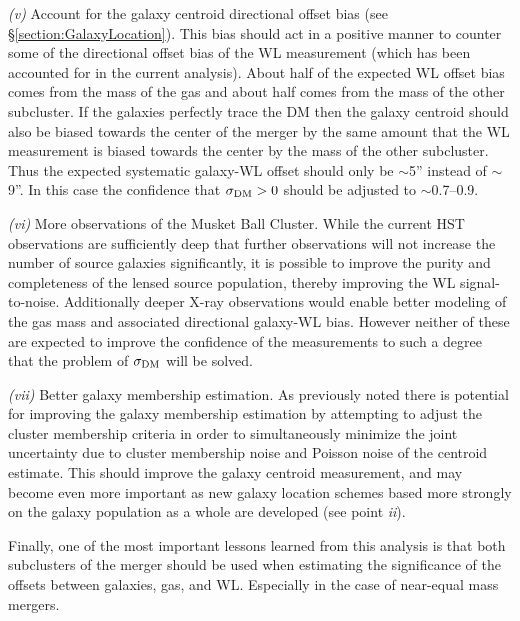 \textit{(v)} Account for the galaxy centroid directional offset bias (see \S\ref{section:GalaxyLocation}).
This bias should act in a positive manner to counter some of the directional offset bias of the WL measurement (which has been accounted for in the current analysis).
About half of the expected WL offset bias comes from the mass of the gas and about half comes from the mass of the other subcluster.
If the galaxies perfectly trace the DM then the galaxy centroid should also be biased towards the center of the merger by the same amount that the WL measurement is biased towards the center by the mass of the other subcluster.
Thus the expected systematic galaxy-WL offset should only be $\sim$5'' instead of $\sim$9''.
In this case the confidence that $\sigma_{\rm DM}>0$ should be adjusted to $\sim$0.7--0.9. 

\textit{(vi)} More observations of the Musket Ball Cluster.
While the current HST observations are sufficiently deep that further observations will not increase the number of source galaxies significantly, it is possible to improve the purity and completeness of the lensed source population, thereby improving the WL signal-to-noise.
Additionally deeper X-ray observations would enable better modeling of the gas mass and associated directional galaxy-WL bias. 
However neither of these are expected to improve the confidence of the measurements to such a degree that the problem of $\sigma_{\rm DM}$ will be solved.

\textit{(vii)} Better galaxy membership estimation.
As previously noted there is potential for improving the galaxy membership estimation by attempting to adjust the cluster membership criteria in order to simultaneously minimize the joint uncertainty due to cluster membership noise and Poisson noise of the centroid estimate.
This should improve the galaxy centroid measurement, and may become even more important as new galaxy location schemes based more strongly on the galaxy population as a whole are developed (see point \textit{ii}).
 
 
Finally, one of the most important lessons learned from this analysis is that both subclusters of the merger should be used when estimating the significance of the offsets between galaxies, gas, and WL.
Especially in the case of near-equal mass mergers.


%



%
%  

